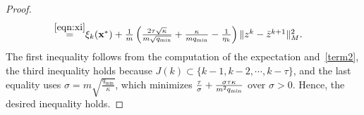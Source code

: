 \begin{proof}
\begin{align*}
 \overset{\eqref{eqn:xi}}= &\textstyle\xi_k(\vx^*)  + \frac{1}{m}
 \left(\frac{2\tau\sqrt{\kappa}}{m\sqrt{q_{\min}}} +
 {\kappa\over mq_{\min}} - \frac{1}{ \eta_k}\right) \|z^k -
 \bar{z}^{k+1}\|_M^2.
\end{align*}
The first inequality follows from the computation of the expectation
and~\eqref{term2}, the third inequality holds because
$J(k)\subset\{k-1,k-2,\cdots,k-\tau\}$, and the last equality uses
$\sigma=m\sqrt{\frac{q_{\min}}{\kappa}}$, which minimizes ${\tau\over
\sigma} + \frac{\sigma\tau\kappa}{m^2q_{\min}}$ over
$\sigma>0$.
Hence, the desired inequality holds.
\hfill\end{proof}

